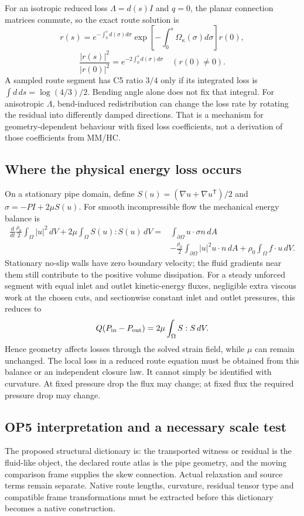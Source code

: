 \documentclass[11pt,a4paper]{article}
\begin{document}
For an isotropic reduced loss $\Lambda=d(s)I$ and $q=0$, the planar
connection matrices commute, so the exact route solution is
\[
r(s)=e^{-\int_0^s d(\sigma)d\sigma}
\exp\left[-\int_0^s\Omega_\kappa(\sigma)d\sigma\right]r(0),
\]
\[
\frac{|r(s)|^2}{|r(0)|^2}
=e^{-2\int_0^s d(\sigma)d\sigma}\quad(r(0)\ne0).
\]
A sampled route segment has C5 ratio $3/4$ only if its integrated loss is
$\int d\,ds=\log(4/3)/2$. Bending angle alone does not fix that integral.
For anisotropic $\Lambda$, bend-induced redistribution can change the loss
rate by rotating the residual into differently damped directions.
That is a mechanism for geometry-dependent behaviour with fixed loss
coefficients, not a derivation of those coefficients from MM/HC.

\subsection{Where the physical energy loss occurs}
On a stationary pipe domain, define
$S(u)=(\nabla u+\nabla u^{\mathsf T})/2$ and
$\sigma=-PI+2\mu S(u)$. For smooth incompressible flow the mechanical
energy balance is
\begin{align*}
\frac{d}{dt}\frac{\rho_0}{2}\int_\Omega|u|^2\,dV
+2\mu\int_\Omega S(u):S(u)\,dV
={}&\int_{\partial\Omega}u\cdot\sigma n\,dA\\
&-\frac{\rho_0}{2}\int_{\partial\Omega}|u|^2u\cdot n\,dA
+\rho_0\int_\Omega f\cdot u\,dV.
\end{align*}
Stationary no-slip walls have zero boundary velocity; the fluid gradients
near them still contribute to the positive volume dissipation.
For a steady unforced segment with equal inlet and outlet kinetic-energy
fluxes, negligible extra viscous work at the chosen cuts, and sectionwise
constant inlet and outlet pressures, this reduces to
\[
Q(P_{\rm in}-P_{\rm out})=2\mu\int_\Omega S:S\,dV.
\]
Hence geometry affects losses through the solved strain field, while $\mu$
can remain unchanged. The local loss in a reduced route equation must be
obtained from this balance or an independent closure law. It cannot simply
be identified with curvature. At fixed pressure drop the flux may change;
at fixed flux the required pressure drop may change.

\subsection{OP5 interpretation and a necessary scale test}
The proposed structural dictionary is: the transported witness or residual
is the fluid-like object, the declared route atlas is the pipe geometry,
and the moving comparison frame supplies the skew connection. Actual
relaxation and source terms remain separate. Native route lengths, curvature,
residual tensor type and compatible frame transformations must be extracted
before this dictionary becomes a native construction.
\end{document}
